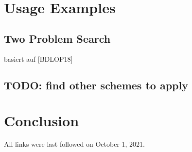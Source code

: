 \documentclass[
  a4paper,  %
  twoside,  %
  bibliography=totoc,
  headsepline,
  cleardoublepage=empty,
  parskip=half,
  draft=false
]{scrbook}
\begin{document}
\chapter{Usage Examples}
\section{Two Problem Search}
basiert auf [BDLOP18]
\section{TODO: find other schemes to apply}


\chapter{Conclusion}

\printbibliography

All links were last followed on October 1, 2021.

\appendix


\pagestyle{empty}
\renewcommand*{\chapterpagestyle}{empty}
\Versicherung
\end{document}
